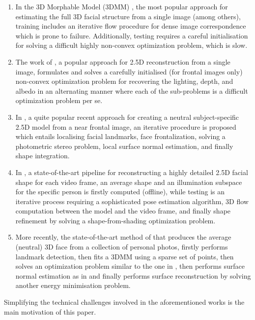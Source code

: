 \begin{enumerate}
\item In the 3D Morphable Model (3DMM) \cite{blanz1999morphable,
    romdhani2005estimating}, the most popular approach for estimating
  the full 3D facial structure from a single image (among others),
  training includes an iterative flow procedure for dense image
  correspondence which is prone to failure. Additionally, testing requires a
  careful initialisation for solving a difficult highly non-convex
  optimization problem, which is slow.
\item The work of \cite{kemelmacher20113d}, a popular approach for
  2.5D reconstruction from a single image, formulates and solves a
  carefully initialised (for frontal images only) non-convex
  optimization problem for recovering the lighting, depth, and albedo
  in an alternating manner where each of the sub-problems is a
  difficult optimization problem per se.
\item In \cite{kemelmacher2011face}, a quite popular recent approach
  for creating a neutral subject-specific 2.5D model from a near
  frontal image, an iterative procedure is proposed which entails
  localising facial landmarks, face frontalization, solving a
  photometric stereo problem, local surface normal estimation, and
  finally shape integration.
\item In \cite{suwajanakorn2014total}, a state-of-the-art pipeline for
  reconstructing a highly detailed 2.5D facial shape for each video
  frame, an average shape and an illumination subspace for the
  specific person is firstly computed (offline), while testing is an
  iterative process requiring a sophisticated pose estimation
  algorithm, 3D flow computation between the model and the video
  frame, and finally shape refinement by solving a shape-from-shading
  optimization problem.
\item More recently, the state-of-the-art method of
  \cite{roth2016adaptive} that produces the average (neutral) 3D face
  from a collection of personal photos, firstly performs landmark
  detection, then fits a 3DMM using a sparse set of points, then
  solves an optimization problem similar to the one in
  \cite{kemelmacher2011face}, then performs surface normal estimation
  as in \cite{kemelmacher2011face} and finally performs surface
  reconstruction by solving another energy minimisation problem.
\end{enumerate}

Simplifying the technical challenges involved in the
aforementioned works is the main motivation of this paper.

